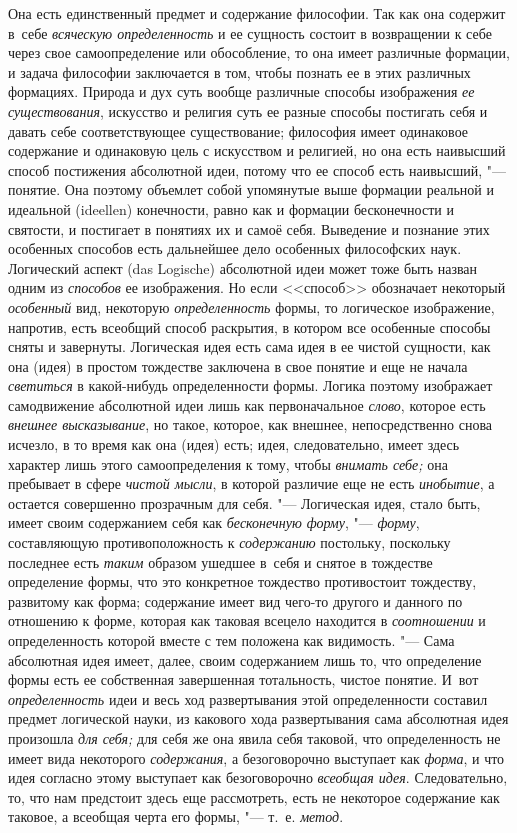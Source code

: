 Она есть единственный предмет и содержание философии. Так как
она содержит в~себе {\em всяческую
определенность} и ее сущность состоит в возвращении к себе
через свое самоопределение или обособление, то она имеет различные
формации, и задача философии заключается в том, чтобы познать ее в этих
различных формациях. Природа и дух суть вообще различные способы
изображения {\em ее существования},
искусство и религия суть ее разные способы постигать себя и
давать себе соответствующее существование; философия имеет одинаковое
содержание и одинаковую цель с искусством и религией, но она
есть наивысший способ постижения абсолютной идеи, потому что ее способ есть
наивысший, "--- понятие. Она поэтому объемлет собой упомянутые
выше формации реальной и идеальной (ideellen) конечности,
равно как и формации бесконечности и святости, и постигает в понятиях их и
самоё себя. Выведение и познание этих особенных способов есть дальнейшее
дело особенных философских наук. Логический аспект (das Logische)
абсолютной идеи может тоже быть назван одним из
{\em способов} ее
изображения. Но если <<способ>> обозначает некоторый
{\em особенный} вид,
некоторую {\em определенность}
формы, то логическое изображение, напротив, есть всеобщий
способ раскрытия, в котором все особенные способы сняты и завернуты.
Логическая идея есть сама идея в ее чистой сущности, как она (идея) в
простом тождестве заключена в свое понятие и еще не начала
{\em светиться} в
какой-нибудь определенности формы. Логика поэтому изображает самодвижение
абсолютной идеи лишь как первоначальное
{\em слово}, которое есть
{\em внешнее высказывание},
но такое, которое, как внешнее, непосредственно снова
исчезло, в то время как она (идея) есть; идея, следовательно, имеет здесь
характер лишь этого самоопределения к тому, чтобы
{\em внимать себе;} она
пребывает в сфере {\em чистой мысли},
в которой различие еще не есть
{\em инобытие}, а
остается совершенно прозрачным для себя. "--- Логическая идея,
стало быть, имеет своим содержанием себя как
{\em бесконечную форму}, "---
{\em форму}, составляющую
противоположность к {\em содержанию}
постольку, поскольку последнее есть
{\em таким} образом
ушедшее в~себя и снятое в тождестве определение формы, что это конкретное
тождество противостоит тождеству, развитому как форма; содержание имеет вид
чего-то другого и данного по отношению к форме, которая как таковая всецело
находится в {\em соотношении}
и определенность которой вместе с тем положена как
видимость. "--- Сама абсолютная идея имеет, далее, своим
содержанием лишь то, что определение формы есть ее собственная завершенная
тотальность, чистое понятие. И~вот
{\em определенность} идеи
и весь ход развертывания этой определенности составил предмет логической
науки, из какового хода развертывания сама абсолютная идея произошла
{\em для себя;} для себя
же она явила себя таковой, что определенность не имеет вида некоторого
{\em содержания}, а
безоговорочно выступает как
{\em форма}, и что идея
согласно этому выступает как безоговорочно
{\em всеобщая идея}.
Следовательно, то, что нам предстоит здесь еще рассмотреть,
есть не некоторое содержание как таковое, а всеобщая черта его формы, "---
т.~е. {\em метод}.

